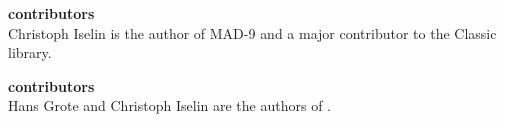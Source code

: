\textbf{\madnine contributors}\\
Christoph Iselin is the author of MAD-9 and a major contributor to the Classic library.

\textbf{\madeight contributors}\\
Hans Grote and Christoph Iselin are the authors of \madeight.

\newpage

